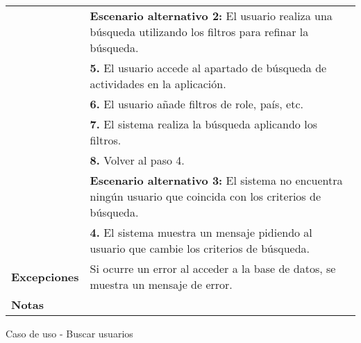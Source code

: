 \begin{analisisCasoDeUso}
\begin{tabular} { | m{3cm} | p{13cm} | }
		                            & {\bfseries Escenario alternativo 2:} El usuario realiza una búsqueda utilizando los filtros para refinar la búsqueda.   \\
		                            & {\bfseries 5.} El usuario accede al apartado de búsqueda de actividades en la aplicación.                               \\
		                            & {\bfseries 6.} El usuario añade filtros de role, país, etc.                                                             \\
		                            & {\bfseries 7.} El sistema realiza la búsqueda aplicando los filtros.                                                    \\
		                            & {\bfseries 8.} Volver al paso 4.                                                                                        \\
		                            & {\bfseries Escenario alternativo 3:} El sistema no encuentra ningún usuario que coincida con los criterios de búsqueda. \\
		                            & {\bfseries 4.} El sistema muestra un mensaje pidiendo al usuario que cambie los criterios de búsqueda.                  \\ \hline
		{\bfseries Excepciones}     & Si ocurre un error al acceder a la base de datos, se muestra un mensaje de error.                                       \\ \hline
		{\bfseries Notas }          &                                                                                                                         \\ \hline
	\end{tabular}
	\caption{Caso de uso - Buscar usuarios}
\end{analisisCasoDeUso}